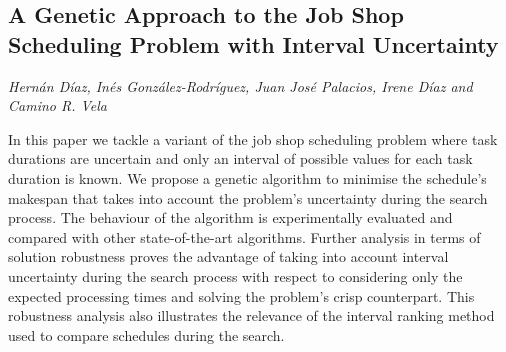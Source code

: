 \documentclass[../booklet.tex]{subfiles}
\begin{document}
\subsection[A Genetic Approach to the Job Shop Scheduling Problem with Interval Uncertainty. {\it Hernán Díaz, Inés González-Rodríguez, Juan José Palacios, Irene Díaz and Camino R. Vela}]{A Genetic Approach to the Job Shop Scheduling Problem with Interval Uncertainty}
    

\begin{center}
  {\it Hernán Díaz, Inés González-Rodríguez, Juan José Palacios, Irene Díaz and Camino R. Vela}
\end{center}



In this paper we tackle a variant of the job shop scheduling problem where task durations are uncertain and only an interval of possible values for each task duration is known. We propose a genetic algorithm to minimise the schedule's makespan that takes into account the problem's uncertainty during the search process. The behaviour of the algorithm is experimentally evaluated  and compared with other state-of-the-art algorithms. Further analysis in terms of solution robustness proves the advantage of taking into account interval uncertainty during the search process with respect to considering only the expected processing times and solving the problem's crisp counterpart. This robustness analysis also illustrates the relevance of the interval ranking method used to compare schedules during the search.
\end{document}
